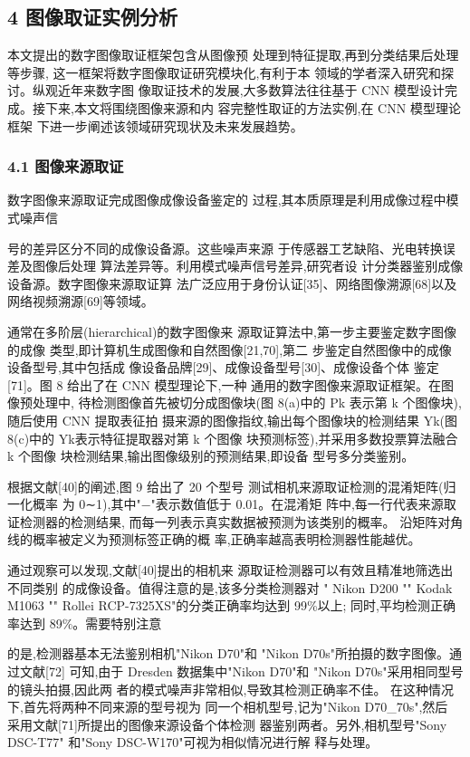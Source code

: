 \documentclass{article}
\begin{document}
\subsection{4 图像取证实例分析}

本文提出的数字图像取证框架包含从图像预 处理到特征提取,再到分类结果后处理等步骤, 这一框架将数字图像取证研究模块化,有利于本 领域的学者深入研究和探讨。纵观近年来数字图 像取证技术的发展,大多数算法往往基于 CNN 模型设计完成。接下来,本文将围绕图像来源和内 容完整性取证的方法实例,在 CNN 模型理论框架 下进一步阐述该领域研究现状及未来发展趋势。

\subsubsection{\textbf{4.1} 图像来源取证}

数字图像来源取证完成图像成像设备鉴定的 过程,其本质原理是利用成像过程中模式噪声信

号的差异区分不同的成像设备源。这些噪声来源 于传感器工艺缺陷、光电转换误差及图像后处理 算法差异等。利用模式噪声信号差异,研究者设 计分类器鉴别成像设备源。数字图像来源取证算 法广泛应用于身份认证[35]、网络图像溯源[68]以及 网络视频溯源[69]等领域。

通常在多阶层(hierarchical)的数字图像来 源取证算法中,第一步主要鉴定数字图像的成像 类型,即计算机生成图像和自然图像[21,70],第二 步鉴定自然图像中的成像设备型号,其中包括成 像设备品牌[29]、成像设备型号[30]、成像设备个体 鉴定[71]。图 8 给出了在 CNN 模型理论下,一种 通用的数字图像来源取证框架。在图像预处理中, 待检测图像首先被切分成图像块(图 8(a)中的 Pk 表示第 k 个图像块),随后使用 CNN 提取表征拍 摄来源的图像指纹,输出每个图像块的检测结果 Yk(图 8(c)中的 Yk表示特征提取器对第 k 个图像 块预测标签),并采用多数投票算法融合 k 个图像 块检测结果,输出图像级别的预测结果,即设备 型号多分类鉴别。

根据文献[40]的阐述,图 9 给出了 20 个型号 测试相机来源取证检测的混淆矩阵(归一化概率 为 0∼1),其中"−"表示数值低于 0.01。在混淆矩 阵中,每一行代表来源取证检测器的检测结果, 而每一列表示真实数据被预测为该类别的概率。 沿矩阵对角线的概率被定义为预测标签正确的概 率,正确率越高表明检测器性能越优。

通过观察可以发现,文献[40]提出的相机来 源取证检测器可以有效且精准地筛选出不同类别 的成像设备。值得注意的是,该多分类检测器对 " Nikon D200 "" Kodak M1063 "" Rollei RCP-7325XS"的分类正确率均达到 99\%以上; 同时,平均检测正确率达到 89\%。需要特别注意

的是,检测器基本无法鉴别相机"Nikon D70"和 "Nikon D70s"所拍摄的数字图像。通过文献[72] 可知,由于 Dresden 数据集中"Nikon D70"和 "Nikon D70s"采用相同型号的镜头拍摄,因此两 者的模式噪声非常相似,导致其检测正确率不佳。 在这种情况下,首先将两种不同来源的型号视为 同一个相机型号,记为"Nikon D70\_70s",然后 采用文献[71]所提出的图像来源设备个体检测 器鉴别两者。另外,相机型号"Sony DSC-T77" 和"Sony DSC-W170"可视为相似情况进行解 释与处理。
\end{document}

